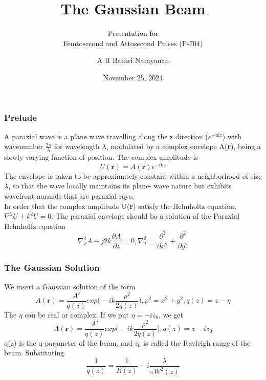 \documentclass[11pt]{beamer}
\begin{document}
	\author{A R Bathri Narayanan}
	\title{The Gaussian Beam}
	\subtitle{Presentation for\\Femtosecond and Attosecond Pulses (P-704)}
	\date{November 25, 2024}
	\subject{Femtosecond and Attosecond pulses}
	\begin{frame}[plain]
		\maketitle
	\end{frame}
	
	\begin{frame}
		\frametitle{Prelude}
		A paraxial wave is a plane wave travelling along the z direction ($e^{-ikz}$) with wavenumber $\frac{2\pi}{\lambda}$ for wavelength $\lambda$, modulated by a complex envelope A(\textbf{r}), being a slowly varying function of position.  The complex amplitude is 
		\[U(\textbf{r})=A(\textbf{r})e^{-ikz}\]
		The envelope is taken to be approximately constant within a
		neighborhood of size $\lambda$, so that the wave locally maintains its plane-
		wave nature but exhibits wavefront normals that are paraxial rays.\\
		In order that the complex amplitude U(\textbf{r}) satisfy the Helmholtz
		equation, $\nabla^2U+k^2U=0$. The paraxial envelope should ba a solution of the Paraxial Helmholtz equation
		\[\nabla^2_T A -j2k\frac{\partial A}{\partial z}=0, \nabla^2_T=\frac{\partial^2}{\partial x^2}+\frac{\partial^2}{\partial y^2}\]
		
	\end{frame}
	
	\begin{frame}
		\frametitle{The Gaussian Solution}
		We insert a Gaussian solution of the form
		\[A(\textbf{r})=\frac{A'}{q(z)}exp\big(-ik\frac{\rho^2}{2q(z)}\big), \rho^2 = x^2+y^2,q(z)=z-\eta\]
		The $\eta$ can be real or complex. If we put $\eta=-iz_0$, we get
		\[A(\textbf{r})=\frac{A'}{q(z)}exp\big(-ik\frac{\rho^2}{2q(z)}\big) ,q(z)=z-iz_0\]
		q(z) is the q-parameter of the beam, and $z_0$ is called the Rayleigh range of the beam.
		Substituting 
		\[\frac{1}{q(z)}=\frac{1}{R(z)}-i\frac{\lambda}{\pi W^2(z)}\]
	\end{frame}
	
\end{document}
